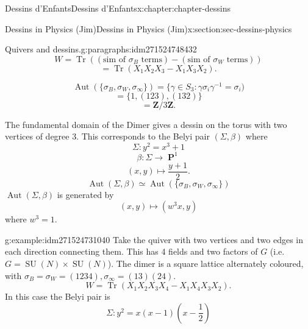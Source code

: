 \documentclass[oneside,10pt,]{book}
\numberwithin{equation}{section}
\newcommand{\inv}{^{-1}}
\newcommand{\ZZ}{\mathbf{Z}}
\DeclareMathOperator{\PP}{\mathbf{P}}
\DeclareMathOperator{\trace}{Tr}
\DeclareMathOperator{\Aut}{Aut}
\DeclareMathOperator{\specialunitary}{SU}
\begin{document}
\begin{chapterptx}{Dessins d'Enfants}{}{Dessins d'Enfants}{}{}{x:chapter:chapter-dessins}
\begin{sectionptx}{Dessins in Physics (Jim)}{}{Dessins in Physics (Jim)}{}{}{x:section:sec-dessins-physics}
\begin{paragraphs}{Quivers and dessins.}{g:paragraphs:idm271524748432}
\begin{equation*}
W = \trace((\text{sim of }\sigma_B\text{ terms}) - (\text{sim of }\sigma_W\text{ terms}))
\end{equation*}
%
\begin{equation*}
= \trace(X_1X_2X_3 - X_1X_3X_2)\text{.}
\end{equation*}
%
\par
%
\begin{equation*}
\Aut( \{\sigma_B,\sigma_W,\sigma_\infty\}) = \{ \gamma\in S_3: \gamma\sigma_i \gamma\inv = \sigma_i)
\end{equation*}
%
\begin{equation*}
= \{1,(123), (132)\}
\end{equation*}
%
\begin{equation*}
= \ZZ/3\ZZ\text{.}
\end{equation*}
%
\par
The fundamental domain of the Dimer gives a dessin on the torus with two vertices of degree 3. This corresponds to the Belyi pair \((\Sigma, \beta)\) where%
\begin{equation*}
\Sigma \colon y^2 = x^3 + 1
\end{equation*}
%
\begin{equation*}
\beta \colon \Sigma  \to \PP^1
\end{equation*}
%
\begin{equation*}
(x,y) \mapsto \frac{y+1}{2}\text{.}
\end{equation*}
%
\begin{equation*}
\Aut(\Sigma, \beta) \simeq \Aut(\{\sigma_B,\sigma_W, \sigma_\infty\})
\end{equation*}
\(\Aut(\Sigma, \beta)\) is generated by%
\begin{equation*}
(x,y) \mapsto (w^3 x,y)
\end{equation*}
where \(w^3 = 1\).%
\begin{example}{}{g:example:idm271524731040}%
Take the quiver with two vertices and two edges in each direction connecting them. This has 4 fields and two factors of \(G\) (i.e. \(G = \specialunitary (N) \times \specialunitary (N)\)). The dimer is a square lattice alternately coloured, with \(\sigma_B = \sigma_W = (1234), \sigma_\infty = (13)(24)\).%
\begin{equation*}
W = \trace (X_1X_2X_3X_4 - X_1 X_4 X_3 X_2)\text{.}
\end{equation*}
In this case the Belyi pair is%
\begin{equation*}
\Sigma \colon y^2= x(x-1)(x-\frac12)

\end{equation*}
\end{example}
\end{paragraphs}
\end{sectionptx}
\end{chapterptx}
\end{document}
